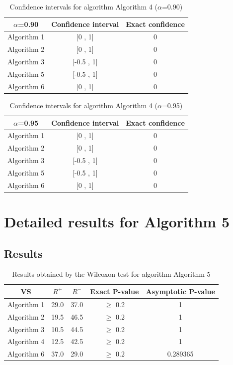 \documentclass[a4paper,10pt]{article}
\begin{document}
\begin{table}[!htp]
\centering\small
\begin{tabular}{
|c|c|c|}
\hline
 $\alpha$=0.90 & Confidence interval & Exact confidence \\ \hline 
Algorithm 1 & [0 , 1] & 0\\ \hline 
Algorithm 2 & [0 , 1] & 0\\ \hline 
Algorithm 3 & [-0.5 , 1] & 0\\ \hline 
Algorithm 5 & [-0.5 , 1] & 0\\ \hline 
Algorithm 6 & [0 , 1] & 0\\ \hline 

\end{tabular}
\caption{Confidence intervals for algorithm Algorithm 4 ($\alpha$=0.90)}
\end{table}
\begin{table}[!htp]
\centering\small
\begin{tabular}{
|c|c|c|}
\hline
 $\alpha$=0.95 & Confidence interval & Exact confidence \\ \hline 
Algorithm 1 & [0 , 1] & 0\\ \hline 
Algorithm 2 & [0 , 1] & 0\\ \hline 
Algorithm 3 & [-0.5 , 1] & 0\\ \hline 
Algorithm 5 & [-0.5 , 1] & 0\\ \hline 
Algorithm 6 & [0 , 1] & 0\\ \hline 

\end{tabular}
\caption{Confidence intervals for algorithm Algorithm 4 ($\alpha$=0.95)}
\end{table}

 \clearpage 


\section{Detailed results for Algorithm 5}


\subsection{Results}

\begin{table}[!htp]
\centering\small
\begin{tabular}{
|c|c|c|c|c|}
\hline
 VS & $R^{+}$ & $R^{-}$ & Exact P-value & Asymptotic P-value \\ \hline 
Algorithm 1 & 29.0 & 37.0 & $\geq$ 0.2 & 1\\ \hline 
Algorithm 2 & 19.5 & 46.5 & $\geq$ 0.2 & 1\\ \hline 
Algorithm 3 & 10.5 & 44.5 & $\geq$ 0.2 & 1\\ \hline 
Algorithm 4 & 12.5 & 42.5 & $\geq$ 0.2 & 1\\ \hline 
Algorithm 6 & 37.0 & 29.0 & $\geq$ 0.2 & 0.289365\\ \hline 

\end{tabular}
\caption{Results obtained by the Wilcoxon test for algorithm Algorithm 5}
\end{table}
\end{document}
